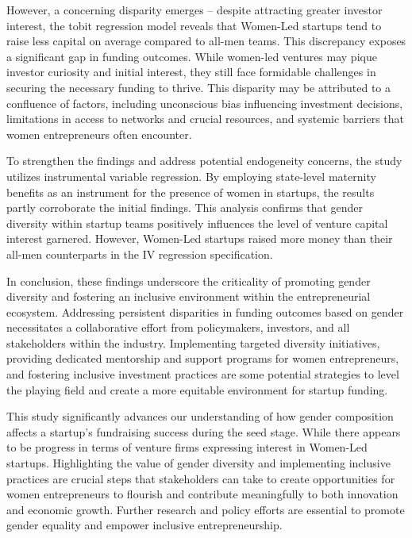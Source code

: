 However, a concerning disparity emerges – despite attracting greater investor interest, the tobit regression model reveals that Women-Led startups tend to raise less capital on average compared to all-men teams. This discrepancy exposes a significant gap in funding outcomes. While women-led ventures may pique investor curiosity and initial interest, they still face formidable challenges in securing the necessary funding to thrive. This disparity may be attributed to a confluence of factors, including unconscious bias influencing investment decisions, limitations in access to networks and crucial resources, and systemic barriers that women entrepreneurs often encounter.

To strengthen the findings and address potential endogeneity concerns, the study utilizes instrumental variable regression. By employing state-level maternity benefits as an instrument for the presence of women in startups, the results partly corroborate the initial findings. This analysis confirms that gender diversity within startup teams positively influences the level of venture capital interest garnered. However, Women-Led startups raised more money than their all-men counterparts in the IV regression specification.

In conclusion, these findings underscore the criticality of promoting gender diversity and fostering an inclusive environment within the entrepreneurial ecosystem. Addressing persistent disparities in funding outcomes based on gender necessitates a collaborative effort from policymakers, investors, and all stakeholders within the industry. Implementing targeted diversity initiatives, providing dedicated mentorship and support programs for women entrepreneurs, and fostering inclusive investment practices are some potential strategies to level the playing field and create a more equitable environment for startup funding.

This study significantly advances our understanding of how gender composition affects a startup's fundraising success during the seed stage. While there appears to be progress in terms of venture firms expressing interest in Women-Led startups. Highlighting the value of gender diversity and implementing inclusive practices are crucial steps that stakeholders can take to create opportunities for women entrepreneurs to flourish and contribute meaningfully to both innovation and economic growth. Further research and policy efforts are essential to promote gender equality and empower inclusive entrepreneurship.




